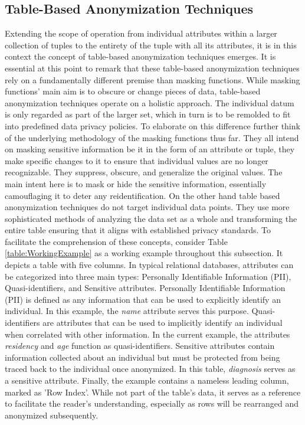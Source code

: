 \subsection{Table-Based Anonymization Techniques}
Extending the scope of operation from individual attributes within a larger collection of tuples to the entirety of the tuple with all its attributes, it is in this context the concept of table-based anonymization techniques emerges. It is essential at this point to remark that these table-based anonymization techniques rely on a fundamentally different premise than masking functions. While masking functions' main aim is to obscure or change pieces of data, table-based anonymization techniques operate on a holistic approach. The individual datum is only regarded as part of the larger set, which in turn is to be remolded to fit into predefined data privacy policies. To elaborate on this difference further think of the underlying methodology of the masking functions thus far. They all intend on masking sensitive information be it in the form of an attribute or tuple, they make specific changes to it to ensure that individual values are no longer recognizable. They suppress, obscure, and generalize the original values. The main intent here is to mask or hide the sensitive information, essentially camouflaging it to deter any reidentification. On the other hand table based anonymization techniques do not target individual data points. They use more sophisticated methods of analyzing the data set as a whole and transforming the entire table ensuring that it aligns with established privacy standards. To facilitate the comprehension of these concepts, consider Table \ref{table:WorkingExample} as a working example throughout this subsection. It depicts a table with five columns. In typical relational databases, attributes can be categorized into three main types: Personally Identifiable Information (PII), Quasi-identifiers, and Sensitive attributes. Personally Identifiable Information (PII) is defined as any information that can be used to explicitly identify an individual. In this example, the \textit{name} attribute serves this purpose. Quasi-identifiers are attributes that can be used to implicitly identify an individual when correlated with other information. In the current example, the attributes \textit{residency} and \textit{age} function as quasi-identifiers. Sensitive attributes contain information collected about an individual but must be protected from being traced back to the individual once anonymized. In this table, \textit{diagnosis} serves as a sensitive attribute. Finally, the example contains a nameless leading column, marked as 'Row Index'. While not part of the table's data, it serves as a reference to facilitate the reader's understanding, especially as rows will be rearranged and anonymized subsequently.
 
